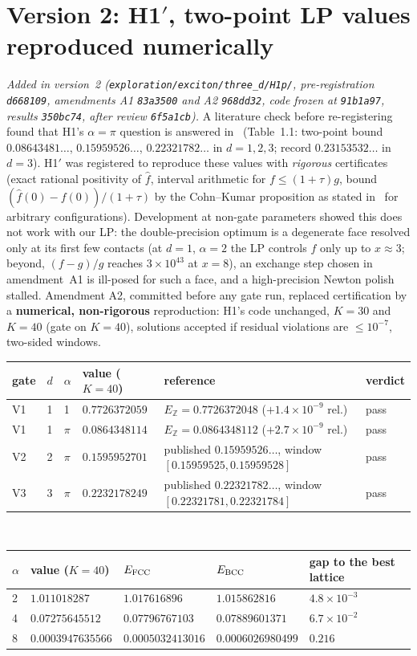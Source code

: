 \documentclass[11pt,a4paper]{article}
\begin{document}
\section{Version 2: H1$'$, two-point LP values reproduced numerically}\label{sec:h1p}
\emph{Added in version~2 (\texttt{exploration/exciton/three\_d/H1p/}, pre-registration \texttt{d668109}, amendments A1
\texttt{83a3500} and A2 \texttt{968dd32}, code frozen at \texttt{91b1a97}, results \texttt{350bc74}, after review \texttt{6f5a1cb}).}
A literature check before re-registering found that H1's $\alpha=\pi$ question is answered in~\cite{CdCI16} (Table~1.1: two-point
bound $0.08643481\ldots$, $0.15959526\ldots$, $0.22321782\ldots$ in $d=1,2,3$; record $0.23153532\ldots$ in $d=3$). H1$'$ was
registered to reproduce these values with \emph{rigorous} certificates (exact rational positivity of $\hat f$, interval
arithmetic for $f\le(1+\tau)g$, bound $(\hat f(0)-f(0))/(1+\tau)$ by the Cohn--Kumar proposition as stated
in~\cite{CdCI16} for arbitrary configurations). Development at non-gate parameters showed this does not work with our LP: the
double-precision optimum is a degenerate face resolved only at its first few contacts (at $d=1$, $\alpha=2$ the LP controls $f$ only up to
$x\approx3$; beyond, $(f-g)/g$ reaches $3\times10^{43}$ at $x=8$), an exchange step chosen in amendment~A1 is
ill-posed for such a face, and a high-precision Newton polish stalled. Amendment A2, committed before any gate run, replaced certification by a \textbf{numerical, non-rigorous}
reproduction: H1's code unchanged, $K=30$ and $K=40$ (gate on $K=40$), solutions accepted if residual violations are
$\le10^{-7}$, two-sided windows.
\begin{center}\small
\begin{tabular}{llllll}\toprule
gate & $d$ & $\alpha$ & value ($K=40$) & reference & verdict\\\midrule
V1 & 1 & 1 & $0.7726372059$ & $E_{\mathbb Z}=0.7726372048$ ($+1.4\times10^{-9}$ rel.) & pass\\
V1 & 1 & $\pi$ & $0.0864348114$ & $E_{\mathbb Z}=0.0864348112$ ($+2.7\times10^{-9}$ rel.) & pass\\
V2 & 2 & $\pi$ & $0.1595952701$ & published $0.15959526\ldots$, window $[0.15959525, 0.15959528]$ & pass\\
V3 & 3 & $\pi$ & $0.2232178249$ & published $0.22321782\ldots$, window $[0.22321781, 0.22321784]$ & pass\\\bottomrule
\end{tabular}\\[4pt]
\begin{tabular}{lllll}\toprule
$\alpha$ & value ($K=40$) & $E_{\rm FCC}$ & $E_{\rm BCC}$ & gap to the best lattice\\\midrule
2 & $1.011018287$ & $1.017616896$ & $1.015862816$ & $4.8\times10^{-3}$\\
4 & $0.07275645512$ & $0.07796767103$ & $0.07889601371$ & $6.7\times10^{-2}$\\
8 & $0.0003947635566$ & $0.0005032413016$ & $0.0006026980499$ & $0.216$\\\bottomrule
\end{tabular}
\end{center}
\end{document}
